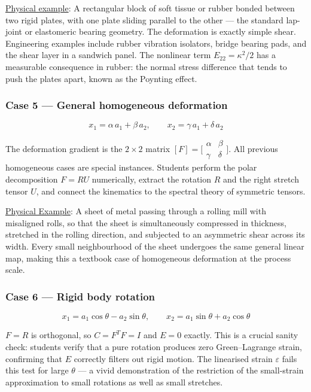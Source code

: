 \documentclass[11pt]{article}
\begin{document}
\uline{Physical example}: A rectangular block of soft tissue or rubber bonded between two rigid plates, with one plate sliding parallel to the other — the standard lap-joint or elastomeric bearing geometry. The deformation is exactly simple shear. Engineering examples include rubber vibration isolators, bridge bearing pads, and the shear layer in a sandwich panel. The nonlinear term \(E_{22} = \kappa^2/2\) has a measurable consequence in rubber: the normal stress difference that tends to push the plates apart, known as the Poynting effect.
\subsubsection*{Case 5 — General homogeneous deformation}
\label{sec:orgea40ec6}
\[
  x_1 = \alpha\, a_1 + \beta\, a_2, \qquad
  x_2 = \gamma\, a_1 + \delta\, a_2
\]

The deformation gradient is the \(2\times 2\) matrix \([F] =
\bigl[\begin{smallmatrix}\alpha & \beta \\ \gamma &
\delta\end{smallmatrix}\bigr]\).  All previous homogeneous cases are
special instances.  Students perform the polar decomposition \(F = RU\)
numerically, extract the rotation \(R\) and the right stretch tensor
\(U\), and connect the kinematics to the spectral theory of symmetric
tensors.

\uline{Physical Example}: A sheet of metal passing through a rolling mill with misaligned rolls, so that the sheet is simultaneously compressed in thickness, stretched in the rolling direction, and subjected to an asymmetric shear across its width. Every small neighbourhood of the sheet undergoes the same general linear map, making this a textbook case of homogeneous deformation at the process scale.
\subsubsection*{Case 6 — Rigid body rotation}
\label{sec:org65c3140}
\[
  x_1 = a_1\cos\theta - a_2\sin\theta, \qquad
  x_2 = a_1\sin\theta + a_2\cos\theta
\]

\(F = R\) is orthogonal, so \(C = F^T F = I\) and \(E = 0\) exactly.  This
is a crucial sanity check: students verify that a pure rotation
produces zero Green--Lagrange strain, confirming that \(E\) correctly
filters out rigid motion.  The linearised strain \(\varepsilon\) fails
this test for large \(\theta\) — a vivid demonstration of the
restriction of the small-strain approximation to small rotations as
well as small stretches.
\end{document}
